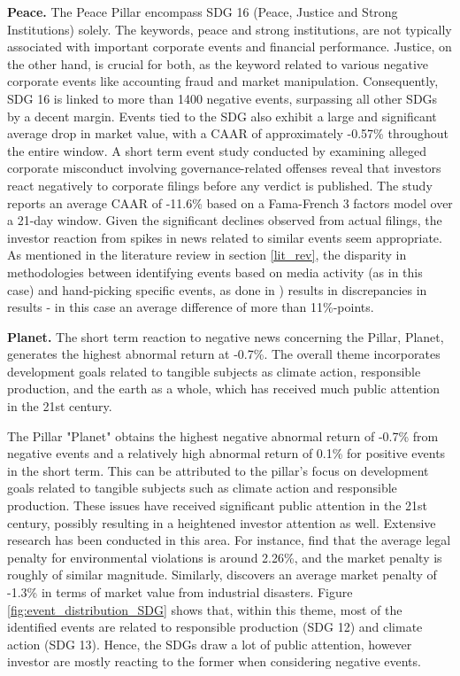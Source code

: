 \textbf{Peace.} The Peace Pillar encompass SDG 16 (Peace, Justice and Strong Institutions) solely. The keywords, peace and strong institutions, are not typically associated with important corporate events and financial performance. Justice, on the other hand, is crucial for both, as the keyword related to various negative corporate events like accounting fraud and market manipulation. Consequently, SDG 16 is linked to more than 1400 negative events, surpassing all other SDGs by a decent margin. Events tied to the SDG also exhibit a large and significant average drop in market value, with a CAAR of approximately -0.57\% throughout the entire window. A short term event study conducted by \cite{bauer2010misdeeds} examining alleged corporate misconduct involving governance-related offenses reveal that investors react negatively to corporate filings before any verdict is published. The study reports an average CAAR of -11.6\% based on a Fama-French 3 factors model over a 21-day window. Given the significant declines observed from actual filings, the investor reaction from spikes in news related to similar events seem appropriate. As mentioned in the literature review in section \ref{lit_rev}, the disparity in methodologies between identifying events based on media activity (as in this case) and hand-picking specific events, as done in \citeauthor{bauer2010misdeeds}) results in discrepancies in results - in this case an average difference of more than 11\%-points. 

\textbf{Planet.} The short term reaction to negative news concerning the Pillar, Planet, generates the highest abnormal return at -0.7\%. The overall theme incorporates development goals related to tangible subjects as climate action, responsible production, and the earth as a whole, which has received much public attention in the 21st century.

The Pillar "Planet" obtains the highest negative abnormal return of -0.7\% from negative events and a relatively high abnormal return of 0.1\% for positive events in the short term. This can be attributed to the pillar's focus on development goals related to tangible subjects such as climate action and responsible production. These issues have received significant public attention in the 21st century, possibly resulting in a heightened investor attention as well. Extensive research has been conducted in this area. For instance, \cite{karpoff2005reputational} find that the average legal penalty for environmental violations is around 2.26\%, and the market penalty is roughly of similar magnitude. Similarly, \cite{capelle2010does} discovers an average market penalty of -1.3\% in terms of market value from industrial disasters. Figure \ref{fig:event_distribution_SDG} shows that, within this theme, most of the identified events are related to responsible production (SDG 12) and climate action (SDG 13). Hence, the SDGs draw a lot of public attention, however investor are mostly reacting to the former when considering negative events. 

